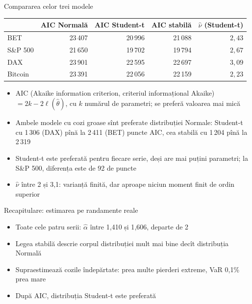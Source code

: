 \begin{frame}{Compararea celor trei modele}
\itemsize{\small}
\begin{center}
\footnotesize
\begin{tabular}{lrrrr}
\toprule
& AIC Normală & AIC Student-t & AIC stabilă & $\hat\nu$ (Student-t) \\
\midrule
BET & 23\,407 & 20\,996 & 21\,088 & $2{,}43$ \\
S\&P 500 & 21\,650 & 19\,702 & 19\,794 & $2{,}67$ \\
DAX & 23\,901 & 22\,595 & 22\,697 & $3{,}09$ \\
Bitcoin & 23\,391 & 22\,056 & 22\,159 & $2{,}23$ \\
\bottomrule
\end{tabular}
\end{center}
\begin{itemize}
    \item AIC (Akaike information criterion, criteriul informațional Akaike) $= 2k - 2\ell(\hat\theta)$, cu $k$ numărul de parametri; se preferă valoarea mai mică
    \item Ambele modele cu cozi groase sînt preferate distribuției Normale: Student-t cu 1\,306 (DAX) pînă la 2\,411 (BET) puncte AIC, cea stabilă cu 1\,204 pînă la 2\,319
    \item Student-t este preferată pentru fiecare serie, deși are mai puțini parametri; la S\&P 500, diferența este de 92 de puncte
    \item $\hat\nu$ între 2 și 3,1: varianță finită, dar aproape niciun moment finit de ordin superior
\end{itemize}
\end{frame}

\begin{frame}{Recapitulare: estimarea pe randamente reale}
\itemsize{\small}
\begin{itemize}
    \item Toate cele patru serii: $\hat\alpha$ între 1{,}410 și 1{,}606, departe de 2
    \item Legea stabilă descrie corpul distribuției mult mai bine decît distribuția Normală
    \item Supraestimează cozile îndepărtate: prea multe pierderi extreme, VaR 0,1\% prea mare
    \item După AIC, distribuția Student-t este preferată
\end{itemize}
\end{frame}



